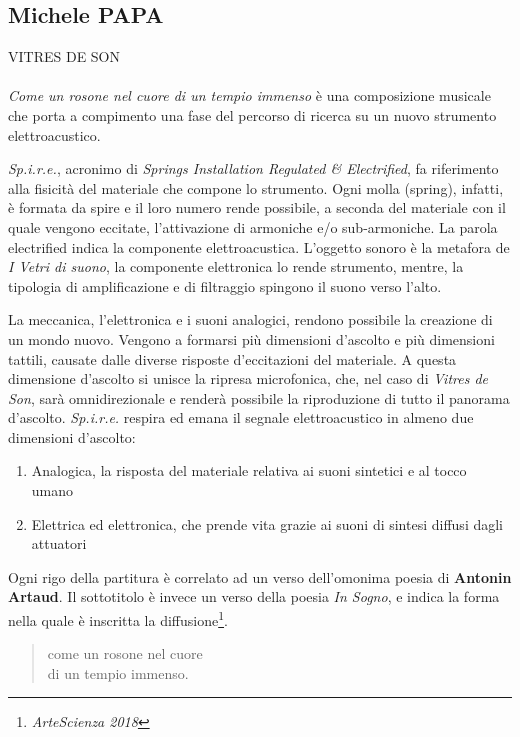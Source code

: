 \documentclass[
	a0,
	portrait
	]{a0poster}
\begin{document}
\begin{multicols}{4}
\section*{\color{cyellow}Michele PAPA}

\lettrine{VITRES DE SON}{}\\~\\ \emph{Come un rosone nel cuore di un tempio immenso} è una composizione musicale che porta a compimento una fase del percorso di ricerca su un nuovo strumento elettroacustico.

\emph{Sp.i.r.e.}, acronimo di \emph{Springs Installation Regulated \& Electrified}, fa riferimento alla fisicità del materiale che compone lo strumento. Ogni molla (spring), infatti, è formata da spire e il loro numero rende possibile, a seconda del materiale con il quale vengono eccitate, l’attivazione di armoniche e/o sub-armoniche. La parola electrified indica la componente elettroacustica. L’oggetto sonoro è la metafora de \emph{I Vetri di suono}, la componente elettronica lo rende strumento, mentre, la tipologia di amplificazione e di filtraggio spingono il suono verso l’alto.

La meccanica, l’elettronica e i suoni analogici, rendono possibile la creazione di un mondo nuovo. Vengono a formarsi più dimensioni d’ascolto e più dimensioni tattili, causate dalle diverse risposte d’eccitazioni del materiale. A questa dimensione d’ascolto si unisce la ripresa microfonica, che, nel caso di \emph{Vitres de Son}, sarà omnidirezionale e renderà possibile la riproduzione di tutto il panorama d’ascolto. \emph{Sp.i.r.e.} respira ed emana il segnale elettroacustico in almeno due dimensioni d’ascolto:

\begin{enumerate}
	\item Analogica, la risposta del materiale relativa ai suoni sintetici e al tocco umano
	\item Elettrica ed elettronica, che prende vita grazie ai suoni di sintesi diffusi dagli attuatori
\end{enumerate}

Ogni rigo della partitura è correlato ad un verso dell’omonima poesia di \textbf{\mbox{Antonin} \mbox{Artaud}}. Il sottotitolo è invece un verso della poesia \emph{In Sogno}, e indica la forma nella quale è inscritta la diffusione\footnote{\color{cpurple} \emph{ArteScienza 2018}}. 

\bigskip

\begin{quotation}
\begin{it}
\begin{flushright}
[...] come un rosone nel cuore \\ di un tempio immenso.


\end{flushright}
\end{it}
\end{quotation}
\end{multicols}
\end{document}
